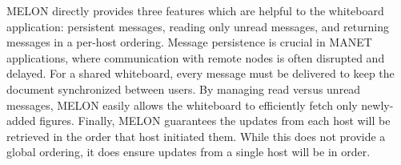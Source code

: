 MELON directly provides three features which are helpful to the whiteboard application: persistent messages, reading only unread messages, and returning messages in a per-host ordering. Message persistence is crucial in MANET applications, where communication with remote nodes is often disrupted and delayed. For a shared whiteboard, every message must be delivered to keep the document synchronized between users. By managing read versus unread messages, MELON easily allows the whiteboard to efficiently fetch only newly-added figures. Finally, MELON guarantees the updates from each host will be retrieved in the order that host initiated them. While this does not provide a global ordering, it does ensure updates from a single host will be in order.

